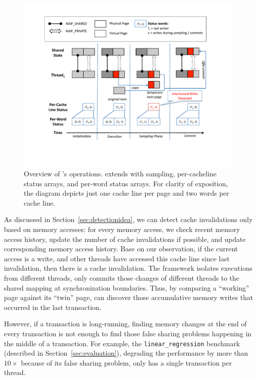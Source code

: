 \begin{figure}[!t]
\centering
\includegraphics[width=6in]{sheriff/figure/sheriffdetective.pdf}
\caption{
Overview of \SheriffDetect{}’s operations. \SheriffDetect{} extends \Sheriff{} with sampling, per-cacheline status arrays, and per-word status arrays. For clarity of exposition, the diagram depicts just one cache line per page and two words per cache line.\label{fig:sheriffdetect}}
\end{figure}

As discussed in Section~\ref{sec:detectionidea}, we can detect cache invalidations only based on memory accesses: for every memory access, we check recent memory access history, update the number of cache invalidations if possible, and update corresponding memory access history. 
Base on our observation, if the current access is a write, and other threads have accessed this cache line since last invalidation, then there is a cache invalidation. 
The \sheriff{} framework isolates executions from different threads, only commits those changes of different threads to the shared mapping at synchronization boundaries. Thus, by comparing a ``working'' page against its ``twin'' page,  \sheriffDetect{} can discover those accumulative memory writes  that occurred in the last transaction.  

However, if a transaction is long-running, finding memory changes at the end of every transaction is not enough 
to find those false sharing problems happening in the middle of a transaction. For example, the \texttt{linear\_regression} benchmark (described in Section~\ref{sec:evaluation}), 
degrading the performance by more than $10\times$ because of its false sharing problem, only has a single transaction per thread. 

